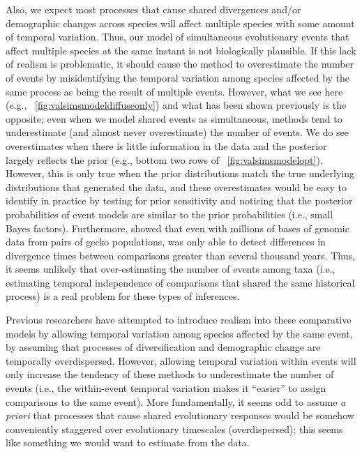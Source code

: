 Also, we expect most processes that cause shared divergences and/or demographic
changes across species will affect multiple species with some amount of
temporal variation.
Thus, our model of simultaneous evolutionary events that affect multiple
species at the same instant is not biologically plausible.
If this lack of realism is problematic, it should cause the method to
overestimate the number of events by misidentifying the temporal variation among
species affected by the same process as being the result of multiple events.
However, what we see here
(e.g., \fig{}~\ref{fig:valsimsmodeldiffuseonly})
and what has been shown previously
\citep{Oaks2012,Oaks2014reply,Oaks2014dpp,Oaks2018ecoevolity,Oaks2018paic}
is the opposite;
even when we model shared events as simultaneous, methods tend to underestimate
(and almost never overestimate) the number of events.
We do see overestimates when there is little information in the data
and the posterior largely reflects the prior 
(e.g., bottom two rows of \fig{}~\ref{fig:valsimsmodelopt}).
However, this is only true when the prior distributions match the true
underlying distributions that generated the data, and these overestimates would
be easy to identify in practice by testing for prior sensitivity and noticing
that the posterior probabilities of event models are similar to the prior
probabilities (i.e., small Bayes factors).
Furthermore, \citet{Oaks2018paic} showed that even with millions of bases of
genomic data from pairs of gecko populations, \ecoevolity was only able to
detect differences in divergence times between comparisons greater than several
thousand years.
Thus, it seems unlikely that over-estimating the number of events among taxa
(i.e., estimating temporal independence of comparisons that shared the same
historical process) is a real problem for these types of inferences.

Previous researchers
\citep{Overcast2017,Gehara2017,Xue2017}
have attempted to introduce realism into these comparative models by allowing
temporal variation among species affected by the same event, by assuming that
processes of diversification and demographic change are temporally
overdispersed.
However, allowing temporal variation within events will only increase the
tendency of these methods to underestimate the number of events (i.e., the
within-event temporal variation makes it ``easier'' to assign comparisons to
the same event).
More fundamentally, it seems odd to assume \emph{a priori} that processes that
cause shared evolutionary responses would be somehow conveniently staggered
over evolutionary timescales (overdispersed);
this seems like something we would want to estimate from the data.

